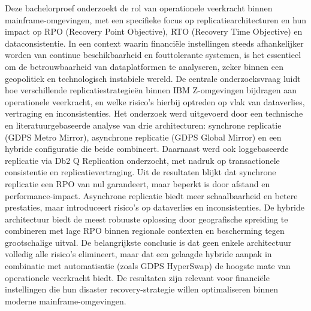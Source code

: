 Deze bachelorproef onderzoekt de rol van operationele veerkracht binnen mainframe-omgevingen, met een specifieke focus op replicatiearchitecturen en hun impact op RPO (Recovery Point Objective), RTO (Recovery Time Objective) en dataconsistentie.
In een context waarin financiële instellingen steeds afhankelijker worden van continue beschikbaarheid en fouttolerante systemen, is het essentieel om de betrouwbaarheid van dataplatformen te analyseren, zeker binnen een geopolitiek en technologisch instabiele wereld.
De centrale onderzoeksvraag luidt hoe verschillende replicatiestrategieën binnen IBM Z-omgevingen bijdragen aan operationele veerkracht, en welke risico's hierbij optreden op vlak van dataverlies, vertraging en inconsistenties.
Het onderzoek werd uitgevoerd door een technische en literatuurgebaseerde analyse van drie architecturen: synchrone replicatie (GDPS Metro Mirror), asynchrone replicatie (GDPS Global Mirror) en een hybride configuratie die beide combineert. 
Daarnaast werd ook loggebaseerde replicatie via Db2 Q Replication onderzocht, met nadruk op transactionele consistentie en replicatievertraging.
Uit de resultaten blijkt dat synchrone replicatie een RPO van nul garandeert, maar beperkt is door afstand en performance-impact. 
Asynchrone replicatie biedt meer schaalbaarheid en betere prestaties, maar introduceert risico's op dataverlies en inconsistenties. 
De hybride architectuur biedt de meest robuuste oplossing door geografische spreiding te combineren met lage RPO binnen regionale contexten en bescherming tegen grootschalige uitval.
De belangrijkste conclusie is dat geen enkele architectuur volledig alle risico's elimineert, maar dat een gelaagde hybride aanpak in combinatie met automatisatie (zoals GDPS HyperSwap) de hoogste mate van operationele veerkracht biedt. 
De resultaten zijn relevant voor financiële instellingen die hun disaster recovery-strategie willen optimaliseren binnen moderne mainframe-omgevingen.
